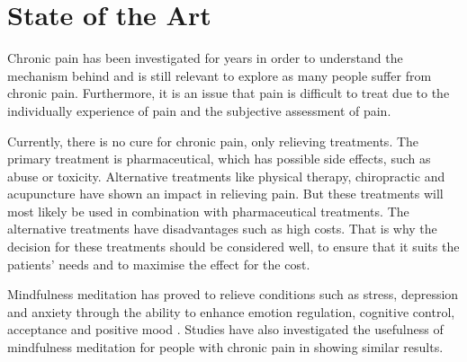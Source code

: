\section{State of the Art}




Chronic pain has been investigated for years in order to understand the mechanism behind and is still relevant to explore as many people suffer from chronic pain. Furthermore, it is an issue that pain is difficult to treat due to the individually experience of pain and the subjective assessment of pain. \cite{ref}

Currently, there is no cure for chronic pain, only relieving treatments. The primary treatment is pharmaceutical, which has possible side effects, such as abuse or toxicity. Alternative treatments like physical therapy, chiropractic and acupuncture have shown an impact in relieving pain. But these treatments will most likely be used in combination with pharmaceutical treatments. The alternative treatments have disadvantages such as high costs. That is why the decision for these treatments should be considered well, to ensure that it suits the patients’ needs and to maximise the effect for the cost. \cite{ref}

Mindfulness meditation has proved to relieve conditions such as stress, depression and anxiety through the ability to enhance emotion regulation, cognitive control, acceptance and positive mood \cite{Zeidan2012, Zeidan2016}. Studies have also investigated the usefulness of mindfulness meditation for people with chronic pain in showing similar results. \cite{ref}

